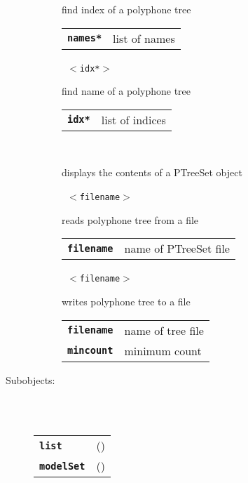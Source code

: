 \begin{description}
\begin{description}
        find index of a polyphone tree

      \begin{tabular}{ll}
 \texttt{\textbf{names*}} & list of names \\
      \end{tabular}
       \texttt{ $<$idx*$>$} \

        find name of a polyphone tree

      \begin{tabular}{ll}
 \texttt{\textbf{idx*}} & list of indices \\
      \end{tabular}
       \texttt{} \

        displays the contents of a PTreeSet object

       \texttt{ $<$filename$>$} \

        reads polyphone tree from a file

      \begin{tabular}{ll}
 \texttt{\textbf{filename}} &  name of PTreeSet file  \\
      \end{tabular}
       \texttt{ $<$filename$>$ } \

        writes polyphone tree to a file

      \begin{tabular}{ll}
 \texttt{\textbf{filename}} &  name of tree file  \\
 \texttt{\textbf{mincount}} &   minimum count  \\
      \end{tabular}
    \end{description}

  \item[Subobjects:] \hfill \\
\ 
    \begin{tabular}{ll}
      \texttt{\textbf{list}} & (\Jref{module}{List}) \\
      \texttt{\textbf{modelSet}} & (\Jref{module}{DistribSet}) \\
    \end{tabular}
\vspace{3mm}

\end{description}

